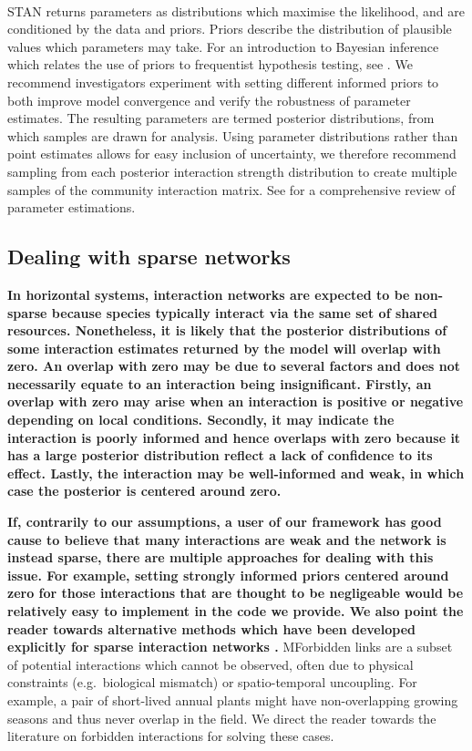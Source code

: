 \documentclass[a4,12pt]{article}
\begin{document}
\begin{refsection}
        \paragraph{}
        STAN returns parameters as distributions which maximise the likelihood, and are conditioned by the data and priors. Priors describe the distribution of plausible values which parameters may take. For an introduction to Bayesian inference which relates the use of priors to frequentist hypothesis testing, see \textcite{Ellison1996}. We recommend investigators experiment with setting different informed priors to both improve model convergence and verify the robustness of parameter estimates. The resulting parameters are termed posterior distributions, from which samples are drawn for analysis. Using parameter distributions rather than point estimates allows for easy inclusion of uncertainty, we therefore recommend sampling from each posterior interaction strength distribution to create multiple samples of the community interaction matrix. See \textcite{Ellison2004} for a comprehensive review of parameter estimations.

    \subsection{Dealing with sparse networks}
    \label{meth:sparse}

    \textbf{In horizontal systems, interaction networks are expected to be non-sparse because species typically interact via the same set of shared resources. Nonetheless, it is likely that the posterior distributions of some interaction estimates returned by the model will overlap with zero. An overlap with zero may be due to several factors and does not necessarily equate to an interaction being insignificant. Firstly, an overlap with zero may arise when an interaction is positive or negative depending on local conditions. Secondly, it may indicate the interaction is poorly informed and hence overlaps with zero because it has a large posterior distribution reflect a lack of confidence to its effect. Lastly, the interaction may be well-informed and weak, in which case the posterior is centered around zero.}

    \textbf{If, contrarily to our assumptions, a user of our framework has good cause to believe that many interactions are weak and the network is instead sparse, there are multiple approaches for dealing with this issue. For example, setting strongly informed priors centered around zero for those interactions that are thought to be negligeable would be relatively easy to implement in the code we provide. We also point the reader towards alternative methods which have been developed explicitly for sparse interaction networks \parencite{Weiss-Lehman2022}.} MForbidden links are a subset of potential interactions which cannot be observed, often due to physical constraints (e.g.\ biological mismatch) or spatio-temporal uncoupling. For example, a pair of short-lived annual plants might have non-overlapping growing seasons and thus never overlap in the field. We direct the reader towards the literature on forbidden interactions \parencite{Olesen2011, Jordano2016} for solving these cases. 


\end{refsection}
\end{document}
